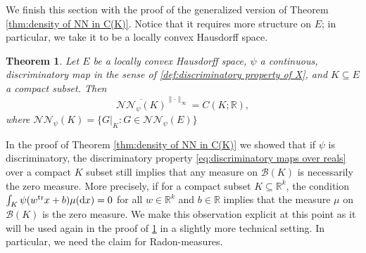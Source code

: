 \documentclass[11pt,a4paper,twoside,openany]{report}
\numberwithin{equation}{section}
\newcommand{\diff}{\mathrm{d}}
\theoremstyle{plain} %
\newtheorem{theorem}{Theorem}[section]
\theoremstyle{definition} %
\theoremstyle{remark} %
\begin{document}
We finish this section with the proof of the generalized version of Theorem \ref{thm:density of NN in C(K)}. Notice that it requires more structure on \(E\); in particular, we take it to be a locally convex Hausdorff space. 
\begin{theorem}\label{thm:density of NN in C(K) generalized}
    Let \(E\) be a locally convex Hausdorff space, \(\psi\) a continuous, discriminatory map in the sense of \ref{def:discriminatory property of X}, and \(K\subseteq E\) a compact subset. Then
    \begin{equation*}
       \overline{\mathcal{NN}_{\psi}(K)}^{\lVert\cdot\rVert_{\infty}}=C(K;\mathbb{R}),
    \end{equation*}
    where \(\mathcal{NN}_{\psi}(K)=\{G|_K:G\in\mathcal{NN}_{\psi}(E)\}\)
\end{theorem}
In the proof of Theorem \ref{thm:density of NN in C(K)} we showed that if \(\psi\) is discriminatory, the discriminatory property \eqref{eq:discriminatory maps over reals} over a compact \(K\) subset still implies that any measure on \(\mathcal{B}(K)\) is necessarily the zero measure. More precisely, if for a compact subset \(K\subseteq\mathbb{R}^k\), the condition
\(\int_K\psi(w^{\rm{tr}}x+b)\mu(\diff x)=0\) for all \(w\in\mathbb{R}^k\) and \(b\in \mathbb{R}\) implies that the measure \(\mu\) on \(\mathcal{B}(K)\) is the zero measure. We make this observation explicit at this point as it will be used again in the proof of \ref{thm:density of NN in C(K) generalized} in a slightly more technical setting. In particular, we need the claim for Radon-measures. 
\end{document}
